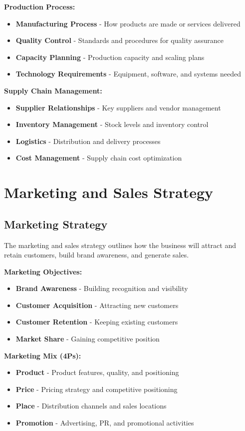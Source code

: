 \documentclass[12pt]{article}
\begin{document}
\textbf{Production Process:}
\begin{itemize}
    \item \textbf{Manufacturing Process} - How products are made or services delivered
    \item \textbf{Quality Control} - Standards and procedures for quality assurance
    \item \textbf{Capacity Planning} - Production capacity and scaling plans
    \item \textbf{Technology Requirements} - Equipment, software, and systems needed
\end{itemize}

\textbf{Supply Chain Management:}
\begin{itemize}
    \item \textbf{Supplier Relationships} - Key suppliers and vendor management
    \item \textbf{Inventory Management} - Stock levels and inventory control
    \item \textbf{Logistics} - Distribution and delivery processes
    \item \textbf{Cost Management} - Supply chain cost optimization
\end{itemize}

\section{Marketing and Sales Strategy}

\subsection{Marketing Strategy}
The marketing and sales strategy outlines how the business will attract and retain customers, build brand awareness, and generate sales.

\textbf{Marketing Objectives:}
\begin{itemize}
    \item \textbf{Brand Awareness} - Building recognition and visibility
    \item \textbf{Customer Acquisition} - Attracting new customers
    \item \textbf{Customer Retention} - Keeping existing customers
    \item \textbf{Market Share} - Gaining competitive position
\end{itemize}

\textbf{Marketing Mix (4Ps):}
\begin{itemize}
    \item \textbf{Product} - Product features, quality, and positioning
    \item \textbf{Price} - Pricing strategy and competitive positioning
    \item \textbf{Place} - Distribution channels and sales locations
    \item \textbf{Promotion} - Advertising, PR, and promotional activities
\end{itemize}
\end{document}
